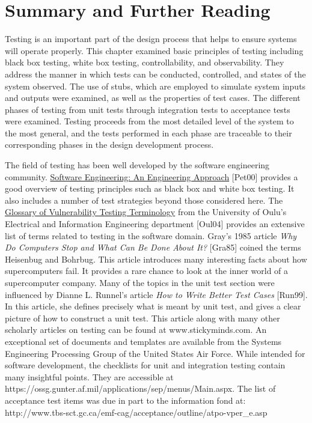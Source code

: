 \section{Summary and Further Reading}
\label{section:summary-and-further-reading}

Testing is an important part of the design process that helps to ensure
systems will operate properly. This chapter examined basic principles of
testing including black box testing, white box testing, controllability,
and observability. They address the manner in which tests can be
conducted, controlled, and states of the system observed. The use of
stubs, which are employed to simulate system inputs and outputs were
examined, as well as the properties of test cases. The different phases
of testing from unit tests through integration tests to acceptance tests
were examined. Testing proceeds from the most detailed level of the
system to the most general, and the tests performed in each phase are
traceable to their corresponding phases in the design development
process.

The field of testing has been well developed by the software engineering
community. \ul{Software Engineering: An Engineering Approach}
{[}Pet00{]} provides a good overview of testing principles such as black
box and white box testing. It also includes a number of test strategies
beyond those considered here. The \ul{Glossary of Vulnerability Testing
Terminology} from the University of Oulu's Electrical and Information
Engineering department {[}Oul04{]} provides an extensive list of terms
related to testing in the software domain. Gray's 1985 article \emph{Why
Do Computers Stop and What Can Be Done About It?} {[}Gra85{]} coined the
terms Heisenbug and Bohrbug. This article introduces many interesting
facts about how supercomputers fail. It provides a rare chance to look
at the inner world of a supercomputer company. Many of the topics in the
unit test section were influenced by Dianne L. Runnel's article
\emph{How to Write Better Test Cases} {[}Run99{]}. In this article, she
defines precisely what is meant by unit test, and gives a clear picture
of how to construct a unit test. This article along with many other
scholarly articles on testing can be found at www.stickyminds.com. An
exceptional set of documents and templates are available from the
Systems Engineering Processing Group of the United States Air Force.
While intended for software development, the checklists for unit and
integration testing contain many insightful points. They are accessible
at https://ossg.gunter.af.mil/applications/sep/menus/Main.aspx. The list of
acceptance test items was due in part to the information fond at:\\
http://www.tbs-sct.gc.ca/emf-cag/acceptance/outline/atpo-vper\_e.asp
